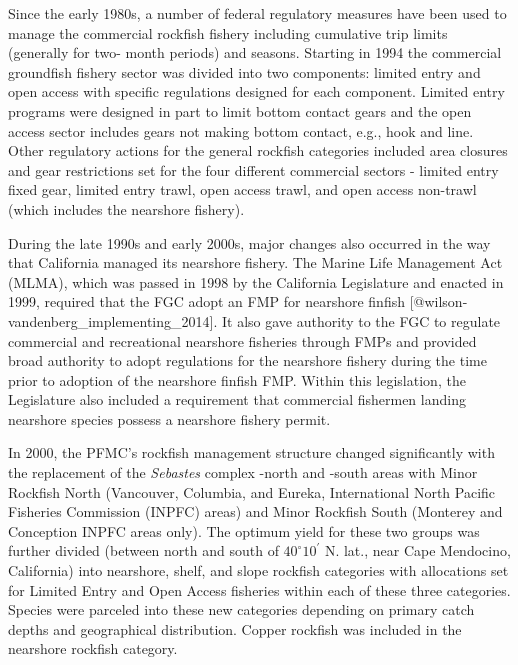 \documentclass[11pt,
  letterpaper,
]{article}
\begin{document}
Since the early 1980s, a number of federal regulatory measures have been used to manage the commercial rockfish fishery including cumulative trip limits (generally for two- month periods) and seasons. Starting in 1994 the commercial groundfish fishery sector was divided into two components: limited entry and open access with specific regulations designed for each component. Limited entry programs were designed in part to limit bottom contact gears and the open access sector includes gears not making bottom contact, e.g., hook and line. Other regulatory actions for the general rockfish categories included area closures and gear restrictions set for the four different commercial sectors - limited entry fixed gear, limited entry trawl, open access trawl, and open access non-trawl (which includes the nearshore fishery).

During the late 1990s and early 2000s, major changes also occurred in the way that California managed its nearshore fishery. The Marine Life Management Act (MLMA), which was passed in 1998 by the California Legislature and enacted in 1999, required that the FGC adopt an FMP for nearshore finfish {[}@wilson-vandenberg\_implementing\_2014{]}. It also gave authority to the FGC to regulate commercial and recreational nearshore fisheries through FMPs and provided broad authority to adopt regulations for the nearshore fishery during the time prior to adoption of the nearshore finfish FMP. Within this legislation, the Legislature also included a requirement that commercial fishermen landing nearshore species possess a nearshore fishery permit.

In 2000, the PFMC's rockfish management structure changed significantly with the replacement of the \emph{Sebastes} complex -north and -south areas with Minor Rockfish North (Vancouver, Columbia, and Eureka, International North Pacific Fisheries Commission (INPFC) areas) and Minor Rockfish South (Monterey and Conception INPFC areas only). The optimum yield for these two groups was further divided (between north and south of $40^\circ 10^\prime$ N. lat., near Cape Mendocino, California) into nearshore, shelf, and slope rockfish categories with allocations set for Limited Entry and Open Access fisheries within each of these three categories. Species were parceled into these new categories depending on primary catch depths and geographical distribution. Copper rockfish was included in the nearshore rockfish category.
\end{document}

